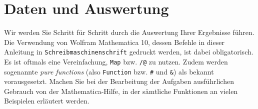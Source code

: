 \documentclass[a4paper,10pt]{article}
\begin{document}







\newpage

\section{Daten und Auswertung}
Wir werden Sie Schritt für Schritt durch die Auswertung Ihrer Ergebnisse führen. Die Verwendung von Wolfram Mathematica 10, dessen Befehle in dieser Anleitung in \texttt{Schreibmaschinenschrift} gedruckt werden, ist dabei obligatorisch. Es ist oftmals eine Vereinfachung, \texttt{Map} bzw. \texttt{/@} zu nutzen. Zudem werden sogenannte \textit{pure functions} (also \texttt{Function} bzw. \texttt{\#} und \texttt{\&}) als bekannt vorausgesetzt. Machen Sie bei der Bearbeitung der Aufgaben ausführlichen Gebrauch von der Mathematica-Hilfe, in der sämtliche Funktionen an vielen Beispielen erläutert werden.

\vspace*{4ex}
\end{document}
